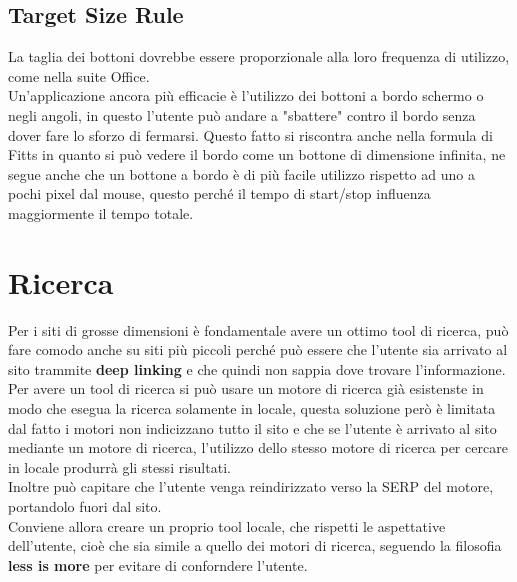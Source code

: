 \subsection{Target Size Rule}
La taglia dei bottoni dovrebbe essere proporzionale alla loro frequenza di utilizzo, come nella suite Office.\\
Un'applicazione ancora più efficacie è l'utilizzo dei bottoni a bordo schermo o negli angoli, in questo l'utente può andare a "sbattere" contro il bordo senza dover fare lo sforzo di fermarsi. Questo fatto si riscontra anche nella formula di Fitts in quanto si può vedere il bordo come un bottone di dimensione infinita, ne segue anche che un bottone a bordo è di più facile utilizzo rispetto ad uno a pochi pixel dal mouse, questo perché il tempo di start/stop influenza maggiormente il tempo totale.

\section{Ricerca}
Per i siti di grosse dimensioni è fondamentale avere un ottimo tool di ricerca, può fare comodo anche su siti più piccoli perché può essere che l'utente sia arrivato al sito trammite \textbf{deep linking} e che quindi non sappia dove trovare l'informazione.\\
Per avere un tool di ricerca si può usare un motore di ricerca già esistenste in modo che esegua la ricerca solamente in locale, questa soluzione però è limitata dal fatto i motori non indicizzano tutto il sito e che se l'utente è arrivato al sito mediante un motore di ricerca, l'utilizzo dello stesso motore di ricerca per cercare in locale produrrà gli stessi risultati.\\
Inoltre può capitare che l'utente venga reindirizzato verso la SERP del motore, portandolo fuori dal sito.\\
Conviene allora creare un proprio tool locale, che rispetti le aspettative dell'utente, cioè che sia simile a quello dei motori di ricerca, seguendo la filosofia \textbf{less is more} per evitare di conforndere l'utente.

